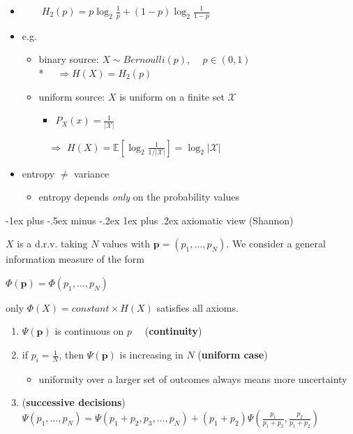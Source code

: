 \documentclass[10pt, landscape]{article}
\makeatletter
\renewcommand{\subsubsection}{\@startsection{subsubsection}{3}{0mm}%
  {-1ex plus -.5ex minus -.2ex}%
  {1ex plus .2ex}%
{\normalfont\small\bfseries}}%
\makeatother
\begin{document}
\begin{multicols*}{4}
  \begin{itemize}
    \item {} \( {\displaystyle{ \quad\quad H_2(p) = p\log_2 \frac{1}{p} + (1-p) \log_2 \frac{1}{1-p} }} \) 
    \item e.g. 
      \begin{itemize}
        \item binary source: $X \sim Bernoulli(p)$, $\quad p \in (0,1)$ \\* $\quad \Rightarrow H(X) = H_2(p)$
        \item uniform source: $X$ is uniform on a finite set $\mathcal{X}$ 
          \begin{itemize}
            \item $P_X(x) = \frac{1}{\vert \mathcal{X} \vert}$
          \end{itemize}
          $\quad \Rightarrow$ $H(X) = \mathbb{E} \left[ \log_2 \frac{1}{1/\vert\mathcal{X}\vert} \right] = \log_2 \vert\mathcal{X}\vert$
      \end{itemize}
    \item entropy $\neq$ variance
      \begin{itemize}
        \item entropy depends \textit{only} on the probability values
      \end{itemize}
  \end{itemize}

  \subsubsection{axiomatic view (Shannon)}

  $X$ is a d.r.v. taking $N$ values with $\mathbf{p} = (p_1, \dots, p_N)$. We consider a general information measure of the form 
  \centerline{$\Phi(\mathbf{p}) = \Phi (p_1, \dots, p_N)$}

  \begin{tightcenter}
    only  $\Phi(X) = constant \times H(X)$ satisfies all axioms.
  \end{tightcenter}

  \begin{enumerate}
    \item $\Psi(\mathbf{p})$ is continuous on $p \quad$ (\textbf{continuity}) 
    \item if $p_i= \frac{1}{N}$, then $\Psi(\mathbf{p}) $ is increasing in $N$ (\textbf{uniform case})
      \begin{itemize}
        \item uniformity over a larger set of outcomes always means more uncertainty
      \end{itemize}
    \item (\textbf{successive decisions}) $\Psi(p_1, \dots, p_N) = \Psi(p_1 + p_2, p_3, \dots, p_N) + (p_1 + p_2) \Psi (\frac{p_1}{p_1 + p_2}, \frac{p_2}{p_1 + p_2})$
  \end{enumerate}


\end{multicols*}
\end{document}
